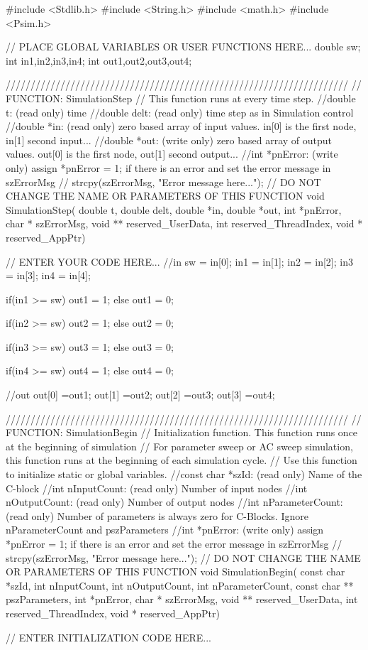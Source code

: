 \begin{mylisting}[language=c,caption=各スイッチングモジュール,label=hurokuB_switxhhikaku]

#include <Stdlib.h>
#include <String.h>
#include <math.h>
#include <Psim.h>

// PLACE GLOBAL VARIABLES OR USER FUNCTIONS HERE...
double sw;
int in1,in2,in3,in4;
int out1,out2,out3,out4;

/////////////////////////////////////////////////////////////////////
// FUNCTION: SimulationStep
//   This function runs at every time step.
//double t: (read only) time
//double delt: (read only) time step as in Simulation control
//double *in: (read only) zero based array of input values. in[0] is the first node, in[1] second input...
//double *out: (write only) zero based array of output values. out[0] is the first node, out[1] second output...
//int *pnError: (write only)  assign  *pnError = 1;  if there is an error and set the error message in szErrorMsg
//    strcpy(szErrorMsg, "Error message here..."); 
// DO NOT CHANGE THE NAME OR PARAMETERS OF THIS FUNCTION
void SimulationStep(
		double t, double delt, double *in, double *out,
		 int *pnError, char * szErrorMsg,
		 void ** reserved_UserData, int reserved_ThreadIndex, void * reserved_AppPtr)
{
// ENTER YOUR CODE HERE...
//in
sw = in[0];
in1 = in[1];
in2 = in[2];
in3 = in[3];
in4 = in[4];

	if(in1 >= sw){
	out1 = 1;
	}else{
	out1 = 0;
	}

	if(in2 >= sw){
	out2 = 1;
	}else{
	out2 = 0;
	}

	if(in3 >= sw){
	out3 = 1;
	}else{
	out3 = 0;
	}

	if(in4 >= sw){
	out4 = 1;
	}else{
	out4 = 0;
	}

//out
out[0] =out1;
out[1] =out2;
out[2] =out3;
out[3] =out4;
}


/////////////////////////////////////////////////////////////////////
// FUNCTION: SimulationBegin
//   Initialization function. This function runs once at the beginning of simulation
//   For parameter sweep or AC sweep simulation, this function runs at the beginning of each simulation cycle.
//   Use this function to initialize static or global variables.
//const char *szId: (read only) Name of the C-block 
//int nInputCount: (read only) Number of input nodes
//int nOutputCount: (read only) Number of output nodes
//int nParameterCount: (read only) Number of parameters is always zero for C-Blocks.  Ignore nParameterCount and pszParameters
//int *pnError: (write only)  assign  *pnError = 1;  if there is an error and set the error message in szErrorMsg
//    strcpy(szErrorMsg, "Error message here..."); 
// DO NOT CHANGE THE NAME OR PARAMETERS OF THIS FUNCTION
void SimulationBegin(
		const char *szId, int nInputCount, int nOutputCount,
		 int nParameterCount, const char ** pszParameters,
		 int *pnError, char * szErrorMsg,
		 void ** reserved_UserData, int reserved_ThreadIndex, void * reserved_AppPtr)
{
// ENTER INITIALIZATION CODE HERE...




}
\end{mylisting}
